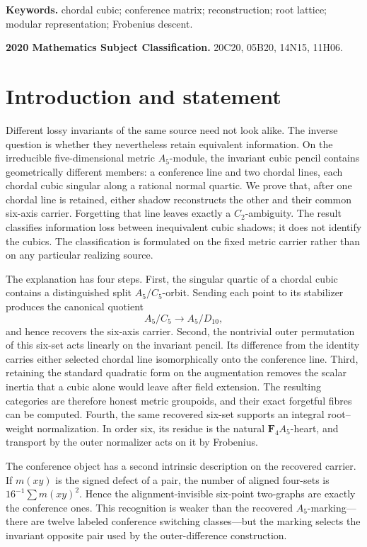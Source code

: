 \documentclass[11pt]{article}
\theoremstyle{definition}
\theoremstyle{remark}
\newcommand{\F}{\mathbf F}
\begin{document}
\noindent\textbf{Keywords.} chordal cubic; conference matrix; reconstruction;
root lattice; modular representation; Frobenius descent.

\smallskip
\noindent\textbf{2020 Mathematics Subject Classification.} 20C20, 05B20,
14N15, 11H06.

\section{Introduction and statement}
\label{sec:introduction}

Different lossy invariants of the same source need not look alike.  The
inverse question is whether they nevertheless retain equivalent information.
On the irreducible five-dimensional metric \(A_5\)-module, the invariant
cubic pencil contains geometrically different members: a conference line and
two chordal lines, each chordal cubic singular along a rational normal
quartic.  We prove that, after one chordal line is retained, either shadow
reconstructs the other and their common six-axis carrier.  Forgetting that
line leaves exactly a \(C_2\)-ambiguity.  The result classifies information
loss between inequivalent cubic shadows; it does not identify the cubics.
The classification is formulated on the fixed metric carrier rather than on
any particular realizing source.

The explanation has four steps.  First, the singular quartic of a chordal
cubic contains a distinguished split \(A_5/C_5\)-orbit.  Sending each point
to its stabilizer produces the canonical quotient
\[
              A_5/C_5\longrightarrow A_5/D_{10},
\]
and hence recovers the six-axis carrier.  Second, the nontrivial outer
permutation of this six-set acts linearly on the invariant pencil.  Its
difference from the identity carries either selected chordal line
isomorphically onto the conference line.  Third, retaining the standard
quadratic form on the augmentation removes the scalar inertia that a cubic
alone would leave after field extension.  The resulting categories are
therefore honest metric groupoids, and their exact forgetful fibres can be
computed.  Fourth, the same recovered six-set supports an integral
root--weight normalization.  In order six, its residue is the natural
\(\F_4A_5\)-heart, and transport by the outer normalizer acts on it by Frobenius.

The conference object has a second intrinsic description on the recovered
carrier.  If \(m(xy)\) is the signed defect of a pair, the number of aligned
four-sets is \(16^{-1}\sum m(xy)^2\).  Hence the alignment-invisible
six-point two-graphs are exactly the conference ones.  This recognition is
weaker than the recovered \(A_5\)-marking---there are twelve labeled
conference switching classes---but the marking selects the invariant opposite
pair used by the outer-difference construction.
\end{document}
